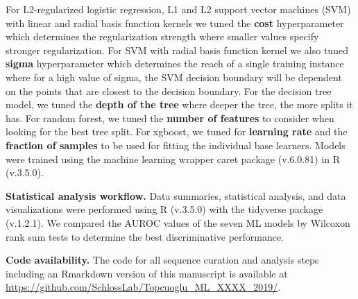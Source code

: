 \documentclass[11pt,]{article}
\begin{document}
For L2-regularized logistic regression, L1 and L2 support vector
machines (SVM) with linear and radial basis function kernels we tuned
the \textbf{cost} hyperparameter which determines the regularization
strength where smaller values specify stronger regularization. For SVM
with radial basis function kernel we also tuned \textbf{sigma}
hyperparameter which determines the reach of a single training instance
where for a high value of sigma, the SVM decision boundary will be
dependent on the points that are closest to the decision boundary. For
the decision tree model, we tuned the \textbf{depth of the tree} where
deeper the tree, the more splits it has. For random forest, we tuned the
\textbf{number of features} to consider when looking for the best tree
split. For xgboost, we tuned for \textbf{learning rate} and the
\textbf{fraction of samples} to be used for fitting the individual base
learners. Models were trained using the machine learning wrapper caret
package (v.6.0.81) in R (v.3.5.0).

\textbf{Statistical analysis workflow.} Data summaries, statistical
analysis, and data visualizations were performed using R (v.3.5.0) with
the tidyverse package (v.1.2.1). We compared the AUROC values of the
seven ML models by Wilcoxon rank sum tests to determine the best
discriminative performance.

\textbf{Code availability.} The code for all sequence curation and
analysis steps including an Rmarkdown version of this manuscript is
available at
\url{https://github.com/SchlossLab/Topcuoglu_ML_XXXX_2019/}.

\newpage
\end{document}

